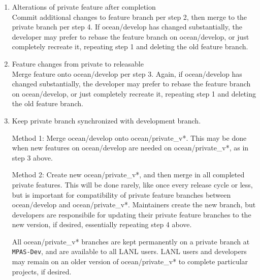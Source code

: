 \documentclass[11pt]{article}
\begin{document}
\begin{enumerate}
\item Alterations of private feature after completion\\
Commit additional changes to feature branch per step 2, then merge to the private branch per step 4.  If ocean/develop has changed substantially, the developer may prefer to rebase the feature branch on ocean/develop, or just completely recreate it, repeating step 1 and deleting the old feature branch.

\item Feature changes from private to releasable \\
Merge feature onto ocean/develop per step 3.  Again, if ocean/develop has changed substantially, the developer may prefer to rebase the feature branch on ocean/develop, or just completely recreate it, repeating step 1 and deleting the old feature branch.

\item Keep private branch synchronized with development branch.

Method 1: Merge ocean/develop onto ocean/private\_v*.  This may be done when new features on ocean/develop are needed on ocean/private\_v*, as in step 3 above.

Method 2: Create new ocean/private\_v*, and then merge in all completed private features.  This will be done rarely, like once every release cycle or less, but is important for compatibility of private feature branches between ocean/develop and ocean/private\_v*.  Maintainers create the new branch, but developers are responsibile for updating their private feature branches to the new version, if desired, essentially repeating step 4 above.

All ocean/private\_v* branches are kept permanently on a private branch at \verb|MPAS-Dev|, and are available to all LANL users.  LANL users and developers may remain on an older version of ocean/private\_v* to complete particular projects, if desired.

\end{enumerate}
\end{document}
